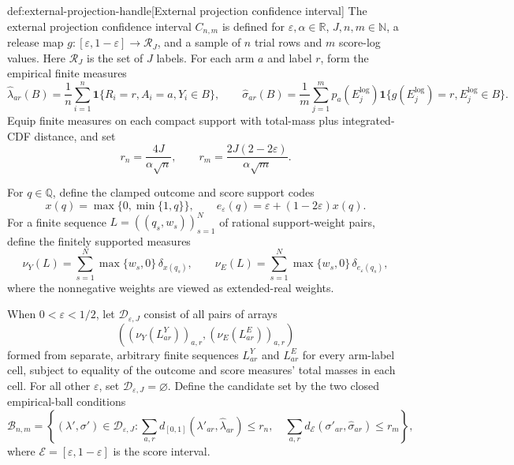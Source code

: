 \begin{definitionv}{def:external-projection-handle}[External projection confidence interval]
The external projection confidence interval \(C_{n,m}\) is defined for \(\varepsilon,\alpha\in\mathbb R\), \(J,n,m\in\mathbb N\), a release map \(g:[\varepsilon,1-\varepsilon]\to\mathcal R_J\), and a sample of \(n\) trial rows and \(m\) score-log values. Here \(\mathcal R_J\) is the set of \(J\) labels. For each arm \(a\) and label \(r\), form the empirical finite measures
\[
\widehat\lambda_{ar}(B)
=\frac1n\sum_{i=1}^{n}\mathbf 1\{R_i=r,A_i=a,Y_i\in B\},
\qquad
\widehat\sigma_{ar}(B)
=\frac1m\sum_{j=1}^{m}p_a(E_j^{\mathrm{log}})
\mathbf 1\{g(E_j^{\mathrm{log}})=r,E_j^{\mathrm{log}}\in B\}.
\]
Equip finite measures on each compact support with total-mass plus integrated-CDF distance, and set
\[
r_n=\frac{4J}{\alpha\sqrt n},
\qquad
r_m=\frac{2J(2-2\varepsilon)}{\alpha\sqrt m}.
\]

For \(q\in\mathbb Q\), define the clamped outcome and score support codes
\[
x(q)=\max\{0,\min\{1,q\}\},
\qquad
e_\varepsilon(q)=\varepsilon+(1-2\varepsilon)x(q).
\]
For a finite sequence \(L=((q_s,w_s))_{s=1}^{N}\) of rational support-weight pairs, define the finitely supported measures
\[
\nu_Y(L)=\sum_{s=1}^{N}\max\{w_s,0\}\,\delta_{x(q_s)},
\qquad
\nu_E(L)=\sum_{s=1}^{N}\max\{w_s,0\}\,\delta_{e_\varepsilon(q_s)},
\]
where the nonnegative weights are viewed as extended-real weights.

When \(0<\varepsilon<1/2\), let \(\mathcal D_{\varepsilon,J}\) consist of all pairs of arrays
\[
\left(
(\nu_Y(L^Y_{ar}))_{a,r},
(\nu_E(L^E_{ar}))_{a,r}
\right)
\]
formed from separate, arbitrary finite sequences \(L^Y_{ar}\) and \(L^E_{ar}\) for every arm-label cell, subject to equality of the outcome and score measures' total masses in each cell. For all other \(\varepsilon\), set \(\mathcal D_{\varepsilon,J}=\varnothing\). Define the candidate set by the two closed empirical-ball conditions
\[
\mathcal B_{n,m}
=
\left\{
(\lambda',\sigma')\in\mathcal D_{\varepsilon,J}:
\sum_{a,r}d_{[0,1]}(\lambda'_{ar},\widehat\lambda_{ar})\le r_n,\quad
\sum_{a,r}d_{\mathcal E}(\sigma'_{ar},\widehat\sigma_{ar})\le r_m
\right\},
\]
where \(\mathcal E=[\varepsilon,1-\varepsilon]\) is the score interval.


\end{definitionv}
